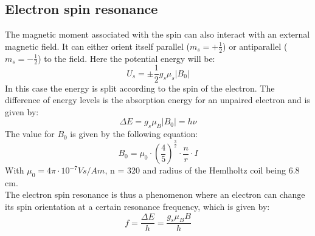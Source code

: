 \documentclass{scrartcl}
\begin{document}
\subsection{Electron spin resonance}
The magnetic moment associated with the spin can also interact with an external magnetic field. It can either orient itself parallel ($m_s = +\frac{1}{2}$) or antiparallel ($m_s = -\frac{1}{2}$) to the field. Here the potential energy will be:
\begin{equation}
    U_s = \pm \frac{1}{2}g_s\mu_s|B_0|
\end{equation}
In this case the energy is split according to the spin of the electron. The difference of energy levels is the absorption energy for an unpaired electron and is given by:
\begin{equation}
    \Delta E = g_s\mu_B|B_0| = h\nu
\end{equation}
The value for $B_0$ is given by the following equation:
\begin{equation*}
    B_0 = \mu_0 \cdot \left(\frac{4}{5}\right)^{\frac{3}{2}} \cdot \frac{n}{r} \cdot I
    \end{equation*}
With $\mu_0 = 4\pi \cdot 10^{-7} Vs/Am$, n = 320 and radius of the Hemlholtz coil being 6.8 cm.\\
The electron spin resonance is thus a phenomenon where an electron can change its spin orientation at a certain resonance frequency, which is given by:
\begin{equation}
    f = \frac{\Delta E}{h} = \frac{g_s\mu_BB}{h}
\end{equation}

\newpage
\end{document}
